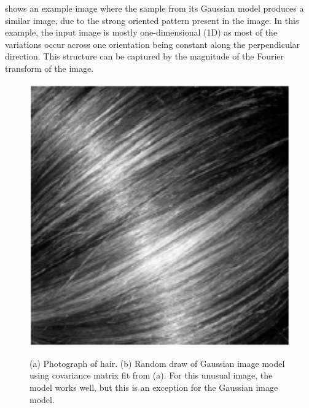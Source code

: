 \Fig{\ref{fig:hair}} shows an example image where the sample from its Gaussian model produces a similar image,  due to the strong oriented pattern present in the image. In this example, the input image is mostly one-dimensional (1D) as most of the variations occur across one orientation being constant along the perpendicular direction. This structure can be captured by the magnitude of the Fourier transform of the image. 

\begin{figure}[t]
\centerline{
{\includegraphics[width=0.4\linewidth]{figures/statistical_image_models/hair1.pdf}}
}
\caption{(a) Photograph of hair.  (b) Random draw of Gaussian image model using covariance matrix fit from (a).  For this unusual image, the model works well, but this is an exception for the Gaussian image model.}
\label{fig:hair}
\end{figure}

